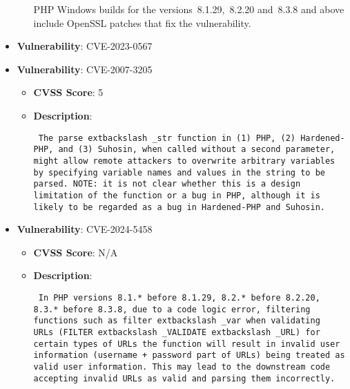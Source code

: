 \documentclass{article}
\begin{document}
\begin{itemize}
\begin{itemize}
{{PHP Windows builds for the versions 8.1.29, 8.2.20 and 8.3.8 and above include OpenSSL patches that fix the vulnerability. }}
        \end{itemize}
    
        \item \textbf{Vulnerability}: CVE-2023-0567
    
        \item \textbf{Vulnerability}: CVE-2007-3205
        \begin{itemize}
            \item \textbf{CVSS Score}:  5 
            \item \textbf{Description}: \parbox{\linewidth}{\texttt{ The parse	extbackslash _str function in (1) PHP, (2) Hardened-PHP, and (3) Suhosin, when called without a second parameter, might allow remote attackers to overwrite arbitrary variables by specifying variable names and values in the string to be parsed.  NOTE: it is not clear whether this is a design limitation of the function or a bug in PHP, although it is likely to be regarded as a bug in Hardened-PHP and Suhosin. }}
        \end{itemize}
    
        \item \textbf{Vulnerability}: CVE-2024-5458
        \begin{itemize}
            \item \textbf{CVSS Score}:  N/A 
            \item \textbf{Description}: \parbox{\linewidth}{\texttt{ In PHP versions 8.1.* before 8.1.29, 8.2.* before 8.2.20, 8.3.* before 8.3.8, due to a code logic error, filtering functions such as filter	extbackslash _var when validating URLs (FILTER	extbackslash _VALIDATE	extbackslash _URL) for certain types of URLs the function will result in invalid user information (username + password part of URLs) being treated as valid user information. This may lead to the downstream code accepting invalid URLs as valid and parsing them incorrectly. }}
        \end{itemize}
    
\end{itemize}
\end{document}

